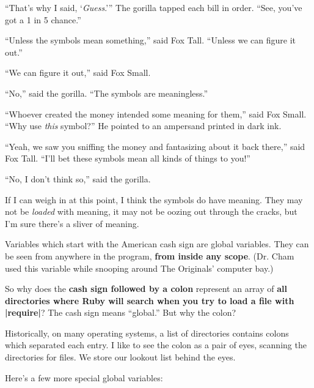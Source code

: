 \documentclass[12pt,twoside]{report}
\begin{document}
``That's why I said, `{\em Guess}.'''  The gorilla tapped each bill in
order.  ``See, you've got a 1 in 5 chance.''

``Unless the symbols mean something,'' said Fox Tall.  ``Unless we can
figure it out.''

``We can figure it out,'' said Fox Small.

``No,'' said the gorilla.  ``The symbols are meaningless.''

``Whoever created the money intended some meaning for them,'' said Fox
Small.  ``Why use {\em this} symbol?''  He pointed to an ampersand
printed in dark ink.

``Yeah, we saw you sniffing the money and fantasizing about it back
there,'' said Fox Tall.  ``I'll bet these symbols mean all kinds of
things to you!''

``No, I don't think so,'' said the gorilla.

If I can weigh in at this point, I think the symbols do have meaning.
They may not be {\em loaded} with meaning, it may not be oozing out
through the cracks, but I'm sure there's a sliver of meaning.




Variables which start with the American cash sign are global
variables.  They can be seen from anywhere in the program, {\bf from
  inside any scope}.  (Dr. Cham used this variable while snooping
around The Originals' computer bay.)

So why does the {\bf cash sign followed by a colon} represent an array
of {\bf all directories where Ruby will search when you try to load a
  file with \rubyinline|require|}?  The cash sign
means ``global.''  But why the colon?

Historically, on many operating systems, a list of directories
contains colons which separated each entry.  I like to see the colon
as a pair of eyes, scanning the directories for files.  We store our
lookout list behind the eyes.

Here's a few more special global variables:
\end{document}
